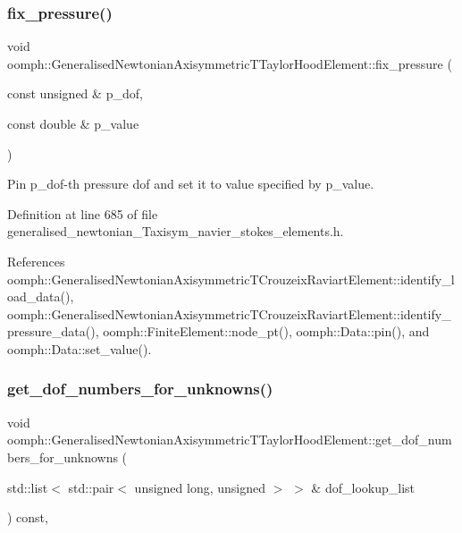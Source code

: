 \subsubsection{\texorpdfstring{fix\+\_\+pressure()}{fix\_pressure()}}
{\footnotesize\ttfamily void oomph\+::\+Generalised\+Newtonian\+Axisymmetric\+T\+Taylor\+Hood\+Element\+::fix\+\_\+pressure (\begin{DoxyParamCaption}\item[{const unsigned \&}]{p\+\_\+dof,  }\item[{const double \&}]{p\+\_\+value }\end{DoxyParamCaption})\hspace{0.3cm}{\ttfamily [inline]}}



Pin p\+\_\+dof-\/th pressure dof and set it to value specified by p\+\_\+value. 



Definition at line 685 of file generalised\+\_\+newtonian\+\_\+\+Taxisym\+\_\+navier\+\_\+stokes\+\_\+elements.\+h.



References oomph\+::\+Generalised\+Newtonian\+Axisymmetric\+T\+Crouzeix\+Raviart\+Element\+::identify\+\_\+load\+\_\+data(), oomph\+::\+Generalised\+Newtonian\+Axisymmetric\+T\+Crouzeix\+Raviart\+Element\+::identify\+\_\+pressure\+\_\+data(), oomph\+::\+Finite\+Element\+::node\+\_\+pt(), oomph\+::\+Data\+::pin(), and oomph\+::\+Data\+::set\+\_\+value().

\mbox{\label{classoomph_1_1GeneralisedNewtonianAxisymmetricTTaylorHoodElement_adf21b3fd505b34cc8546f97499b3a55e}} 
\subsubsection{\texorpdfstring{get\+\_\+dof\+\_\+numbers\+\_\+for\+\_\+unknowns()}{get\_dof\_numbers\_for\_unknowns()}}
{\footnotesize\ttfamily void oomph\+::\+Generalised\+Newtonian\+Axisymmetric\+T\+Taylor\+Hood\+Element\+::get\+\_\+dof\+\_\+numbers\+\_\+for\+\_\+unknowns (\begin{DoxyParamCaption}\item[{std\+::list$<$ std\+::pair$<$ unsigned long, unsigned $>$ $>$ \&}]{dof\+\_\+lookup\+\_\+list }\end{DoxyParamCaption}) const\hspace{0.3cm}{\ttfamily [inline]}, {\ttfamily [virtual]}}



